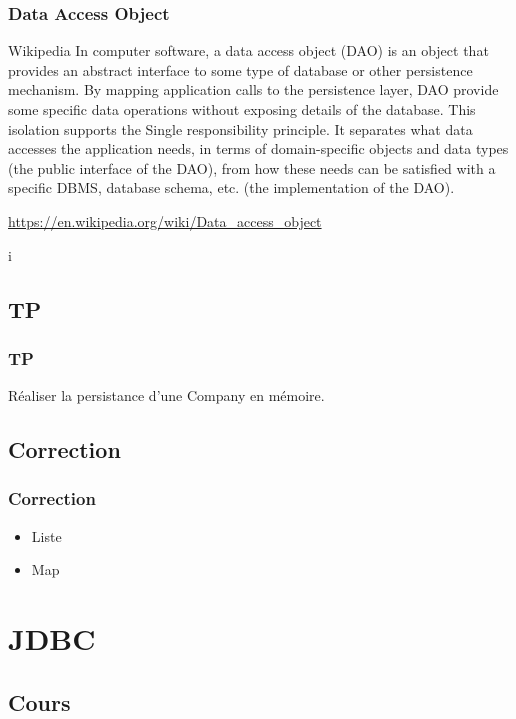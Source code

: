 \documentclass[t,12pt]{beamer}
\begin{document}
\begin{frame}
	\frametitle{Data Access Object}

	\begin{block}{Wikipedia}
		In computer software, a data access object (DAO) is an object that provides an abstract interface to some type of database or other persistence mechanism. By mapping application calls to the persistence layer, DAO provide some specific data operations without exposing details of the database. This isolation supports the Single responsibility principle. It separates what data accesses the application needs, in terms of domain-specific objects and data types (the public interface of the DAO), from how these needs can be satisfied with a specific DBMS, database schema, etc. (the implementation of the DAO).
	\end{block}
	\url{https://en.wikipedia.org/wiki/Data\_access\_object}
\end{frame}

i\subsection{TP}
\begin{frame}
	\frametitle{TP}
	
	R\'ealiser la persistance d'une Company en m\'emoire.
\end{frame}

\subsection{Correction}
\begin{frame}
	\frametitle{Correction}

	\begin{itemize}
		\item Liste
		\item Map
	\end{itemize}
\end{frame}

\section{JDBC}

\begin{frame}
	\tableofcontents[currentsection]
\end{frame}

\subsection{Cours}
\end{document}
